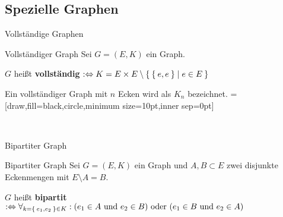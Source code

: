 \subsection{Spezielle Graphen}
\begin{frame}{Vollständige Graphen}
\begin{block}{Vollständiger Graph}
Sei $G = (E, K)$ ein Graph.

$G$ heißt \textbf{vollständig} $:\Leftrightarrow K = E \times E \setminus \Set{\Set{e, e} | e \in E}$
\end{block}

Ein vollständiger Graph mit $n$ Ecken wird als $K_n$ bezeichnet.
\pause
{}=[draw,fill=black,circle,minimum size=10pt,inner sep=0pt]
\begin{gallery}
    \\
\end{gallery}
\end{frame}

\begin{frame}{Bipartiter Graph}
\begin{block}{Bipartiter Graph}
Sei $G = (E, K)$ ein Graph und $A, B \subset E$ zwei disjunkte Eckenmengen mit
$E \setminus A = B$.

$G$ heißt \textbf{bipartit} $:\Leftrightarrow \forall_{k = \Set{e_1, e_2} \in K}: (e_1 \in A \text{ und } e_2 \in B) \text{ oder } (e_1 \in B \text{ und } e_2 \in A) $
\end{block}

\begin{gallery}
    \\
\end{gallery}
\end{frame}

